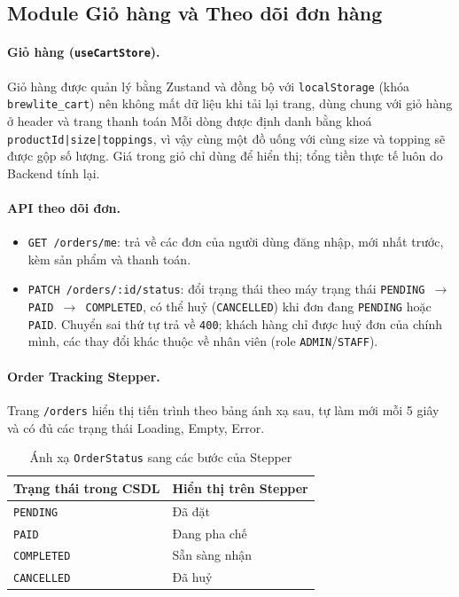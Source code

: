 \subsection{Module Giỏ hàng và Theo dõi đơn hàng}
\label{sec:cart-tracking}

\paragraph{Giỏ hàng (\texttt{useCartStore}).}
Giỏ hàng được quản lý bằng Zustand và đồng bộ với \texttt{localStorage} (khóa \texttt{brewlite\_cart}) nên không mất dữ liệu khi tải lại trang, dùng chung với giỏ hàng ở header và trang thanh toán
Mỗi dòng được định danh bằng khoá \texttt{productId|size|toppings}, vì vậy cùng một đồ uống với cùng
size và topping sẽ được gộp số lượng. Giá trong giỏ chỉ dùng để hiển thị; tổng tiền thực tế
luôn do Backend tính lại.

\paragraph{API theo dõi đơn.}
\begin{itemize}
  \item \texttt{GET /orders/me}: trả về các đơn của người dùng đăng nhập, mới nhất trước, kèm sản phẩm và thanh toán.
  \item \texttt{PATCH /orders/:id/status}: đổi trạng thái theo máy trạng thái
        \texttt{PENDING $\rightarrow$ PAID $\rightarrow$ COMPLETED}, có thể huỷ (\texttt{CANCELLED}) khi đơn đang
        \texttt{PENDING} hoặc \texttt{PAID}. Chuyển sai thứ tự trả về \texttt{400}; khách hàng chỉ được huỷ đơn của chính mình,
        các thay đổi khác thuộc về nhân viên (role \texttt{ADMIN}/\texttt{STAFF}).
\end{itemize}

\paragraph{Order Tracking Stepper.}
Trang \texttt{/orders} hiển thị tiến trình theo bảng ánh xạ sau, tự làm mới mỗi 5 giây và có đủ các trạng thái Loading, Empty, Error.

\begin{table}[H]
  \centering
  \begin{tabular}{|l|l|}
    \hline
    \textbf{Trạng thái trong CSDL} & \textbf{Hiển thị trên Stepper} \\ \hline
    \texttt{PENDING}   & Đã đặt \\ \hline
    \texttt{PAID}      & Đang pha chế \\ \hline
    \texttt{COMPLETED} & Sẵn sàng nhận \\ \hline
    \texttt{CANCELLED} & Đã huỷ \\ \hline
  \end{tabular}
  \caption{Ánh xạ \texttt{OrderStatus} sang các bước của Stepper}
\end{table}
